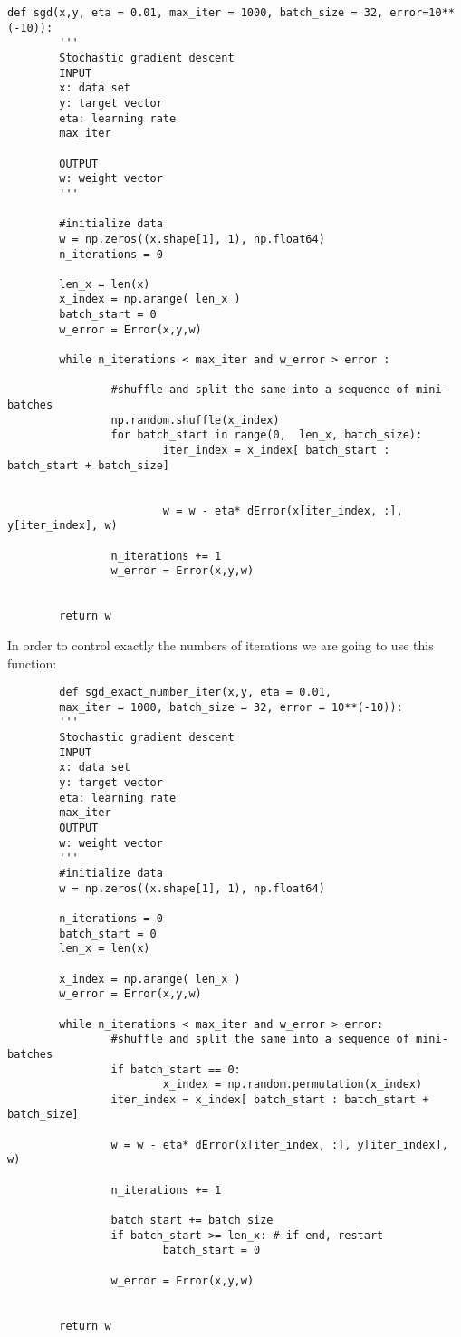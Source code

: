   
  \begin{verbatim}
def sgd(x,y, eta = 0.01, max_iter = 1000, batch_size = 32, error=10**(-10)):
        '''
        Stochastic gradient descent
        INPUT 
        x: data set
        y: target vector
        eta: learning rate
        max_iter 

        OUTPUT 
        w: weight vector
        '''
  
        #initialize data
        w = np.zeros((x.shape[1], 1), np.float64)
        n_iterations = 0

        len_x = len(x)
        x_index = np.arange( len_x )
        batch_start = 0
        w_error = Error(x,y,w)

        while n_iterations < max_iter and w_error > error :
  
                #shuffle and split the same into a sequence of mini-batches
                np.random.shuffle(x_index)
                for batch_start in range(0,  len_x, batch_size):
                        iter_index = x_index[ batch_start : batch_start + batch_size]

        
                        w = w - eta* dError(x[iter_index, :], y[iter_index], w)
        
                n_iterations += 1
                w_error = Error(x,y,w)

   
        return w
      \end{verbatim}

      In order to control exactly the numbers of iterations we are going to use this function: 

      \begin{verbatim}
        def sgd_exact_number_iter(x,y, eta = 0.01,
        max_iter = 1000, batch_size = 32, error = 10**(-10)):
        '''
        Stochastic gradient descent
        INPUT 
        x: data set
        y: target vector
        eta: learning rate
        max_iter 
        OUTPUT 
        w: weight vector
        '''
        #initialize data
        w = np.zeros((x.shape[1], 1), np.float64)
    
        n_iterations = 0
        batch_start = 0
        len_x = len(x)
    
        x_index = np.arange( len_x )
        w_error = Error(x,y,w)
 
        while n_iterations < max_iter and w_error > error:
                #shuffle and split the same into a sequence of mini-batches
                if batch_start == 0:
                        x_index = np.random.permutation(x_index)
                iter_index = x_index[ batch_start : batch_start + batch_size]

                w = w - eta* dError(x[iter_index, :], y[iter_index], w)
                
                n_iterations += 1

                batch_start += batch_size
                if batch_start >= len_x: # if end, restart
                        batch_start = 0
                
                w_error = Error(x,y,w)


        return w

      \end{verbatim}



